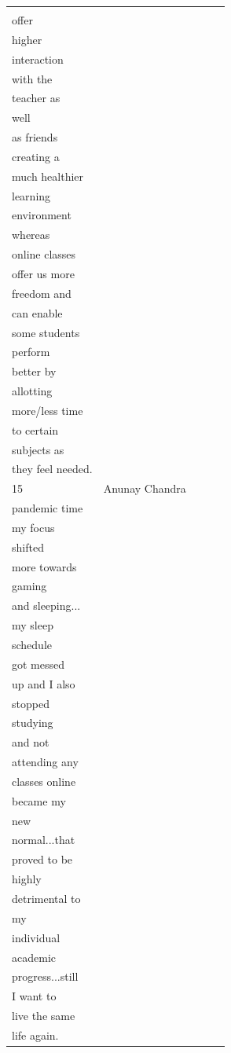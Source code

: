 \documentclass[11pt]{scrartcl}
\begin{document}
\begin{longtable}[c]{|l|l|l|l|l|}
		\begin{tabular}[c]{@{}l@{}}Offline classes\\  offer \\ higher \\ interaction   \\ with the \\ teacher as \\ well \\ as friends \\ creating a \\ much healthier \\ learning  \\ environment \\ whereas \\ online classes \\ offer us more \\ freedom and \\ can enable \\ some students\\  perform \\ better by \\ allotting \\ more/less time\\  to certain \\ subjects as \\ they feel needed.\end{tabular} \\ \hline
		15 &
		Anunay Chandra &
		\begin{tabular}[c]{@{}l@{}}During the \\ pandemic time\\  my focus \\ shifted   \\ more towards \\ gaming \\ and sleeping...\\ my sleep\\  schedule \\ got messed\\  up and I also   \\ stopped \\ studying \\ and not \\ attending any \\ classes online \\ became my \\ new   \\ normal...that \\ proved to be \\ highly \\ detrimental to \\ my \\ individual \\ academic   \\ progress...still\\  I want to \\ live the same\\  life again.\end{tabular} &

\end{longtable}
\end{document}
